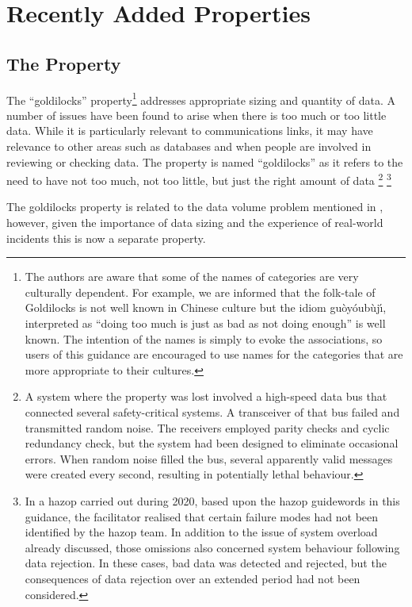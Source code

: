 \section{Recently Added Properties}
\subsection{The  Property}
The ``\Gls{goldilocks}'' property\footnote{The authors are aware that some of the names of categories are very culturally dependent. For example, we are informed that the folk-tale of Goldilocks is not well known in Chinese culture but the idiom gu\`oy\'oub\`uj\'\i, interpreted as ``doing too much is just as bad as not doing enough'' is well known. The intention of the names is simply to evoke the associations, so users of this guidance are encouraged to use names for the categories that are more appropriate to their cultures.} addresses appropriate sizing and quantity of data. A number of issues have been found to arise when there is too much or too little data. While it is particularly relevant to communications links, it may have relevance to other areas such as \glspl{database} and when people are involved in reviewing or checking data. The property is named ``\gls{goldilocks}'' as it refers to the need to have not too much, not too little, but just the right amount of data%
%
\footnote{A system where the property was lost involved a high-speed data bus that connected several safety-critical systems. A transceiver of that bus failed and transmitted random noise. The receivers employed parity checks and cyclic redundancy check, but the system had been designed to eliminate occasional \glspl{error}. When random noise filled the bus, several apparently valid messages were created every second, resulting in potentially lethal behaviour.}	
\footnote{In a \gls{hazop} carried out during 2020, based upon the \gls{hazop} guidewords in this guidance, the facilitator realised that certain failure modes had not been identified by the \gls{hazop} team. In addition to the issue of system overload already discussed, those omissions also concerned system behaviour following data rejection. In these cases, bad data was detected and rejected, but the consequences of data rejection over an extended period had not been considered.}

The \gls{goldilocks} property is related to the data volume problem mentioned in , however, given the importance of data sizing and the experience of real-world incidents this is now a separate property.
%
